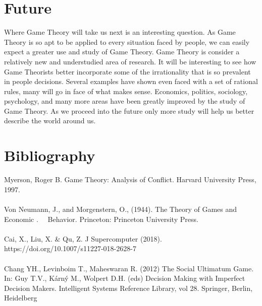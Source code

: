 \documentclass[12pt]{article}
\begin{document}
 	\section{Future}
	Where Game Theory will take us next is an interesting question. As Game Theory is so apt to be applied to every situation faced by people, we can easily expect a greater use and study of Game Theory. Game Theory is consider a relatively new and understudied area of research. It will be interesting to see how Game Theorists better incorporate some of the irrationality that is so prevalent in people decisions. Several examples have shown even faced with a set of rational rules, many will go in face of what makes sense. Economics, politics, sociology, psychology, and many more areas have been greatly improved by the study of Game Theory. As we proceed into the future only more study will help us better describe the world around us.
	\pagebreak
	\section{Bibliography}
	Myerson, Roger B. Game Theory: Analysis of Conflict. Harvard University Press, 1997.\\
	\\
	Von Neumann, J., and Morgenstern, O., (1944). The Theory of Games and Economic 
	$  .\quad $	Behavior. Princeton: Princeton University Press.\\
	\\
	Cai, X., Liu, X. \& Qu, Z. J Supercomputer (2018). https://doi.org/10.1007/s11227-018-2628-7\\
	\\
	Chang YH., Levinboim T., Maheswaran R. (2012) The Social Ultimatum Game. In: Guy T.V., Kárný M., Wolpert D.H. (eds) Decision Making with Imperfect Decision Makers. Intelligent Systems Reference Library, vol 28. Springer, Berlin, Heidelberg
	
\end{document}
